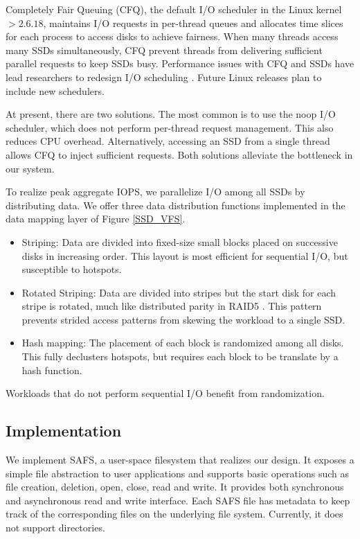 Completely Fair Queuing (CFQ), the default I/O scheduler in the Linux kernel $>2.6.18$,
maintains I/O requests in per-thread queues and allocates time slices for each process
to access disks to achieve fairness. 
When many threads access many SSDs simultaneously, CFQ prevent threads 
from delivering sufficient parallel requests to keep SSDs busy.
Performance issues with CFQ and SSDs have lead researchers to redesign 
I/O scheduling \cite{Park12}. Future Linux releases plan to include new schedulers.

At present, there are two solutions.  The most common is to use the 
noop I/O scheduler, which does not perform per-thread
request management.  This also reduces CPU overhead.  Alternatively, accessing
an SSD from a single thread allows CFQ to inject sufficient requests.
Both solutions alleviate the bottleneck in our system.  

\label{data_layout}
To realize peak aggregate IOPS, we parallelize I/O among all SSDs by 
distributing data.  We offer three data distribution functions implemented in 
the data mapping layer of Figure \ref{SSD_VFS}.

\vspace{-10pt}
\begin{itemize}
\addtolength{\itemsep}{-5pt}
	\item Striping: Data are divided into fixed-size small blocks placed on 
    successive disks in increasing order.  This layout is most efficient
    for sequential I/O, but susceptible to hotspots.
	\item Rotated Striping: Data are divided into stripes but the start disk for
    each stripe is rotated, much like distributed parity in RAID5 \cite{raid}.
    This pattern prevents strided access patterns from skewing the workload
    to a single SSD.
	\item Hash mapping: The placement of each block is randomized
    among all disks.  This fully declusters hotspots, but requires each
    block to be translate by a hash function.
\end{itemize}
\vspace{-10pt}

\noindent Workloads that do not perform sequential I/O benefit from randomization.

\subsection{Implementation}
We implement SAFS, a user-space filesystem that realizes our design. It exposes
a simple file abstraction to user applications and supports basic operations
such as file creation, deletion, open, close, read and write.
It provides both synchronous and asynchronous read and write interface.
Each SAFS file has metadata to keep track of the corresponding files on the
underlying file system. Currently, it does not support directories.

